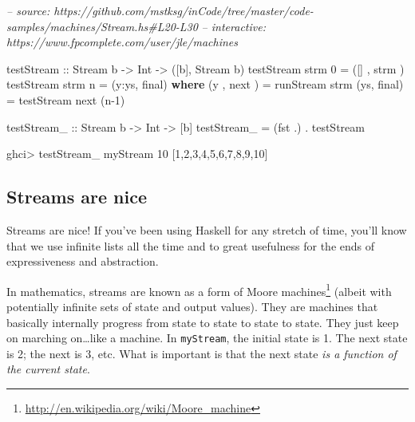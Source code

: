\documentclass[]{article}
\newenvironment{Shaded}{}{}
\newcommand{\CommentTok}[1]{\textcolor[rgb]{0.38,0.63,0.69}{\textit{#1}}}
\newcommand{\DataTypeTok}[1]{\textcolor[rgb]{0.56,0.13,0.00}{#1}}
\newcommand{\DecValTok}[1]{\textcolor[rgb]{0.25,0.63,0.44}{#1}}
\newcommand{\FunctionTok}[1]{\textcolor[rgb]{0.02,0.16,0.49}{#1}}
\newcommand{\KeywordTok}[1]{\textcolor[rgb]{0.00,0.44,0.13}{\textbf{#1}}}
\newcommand{\NormalTok}[1]{#1}
\newcommand{\OtherTok}[1]{\textcolor[rgb]{0.00,0.44,0.13}{#1}}
\renewcommand{\href}[2]{#2\footnote{\url{#1}}}
\begin{document}
\begin{Shaded}
\begin{Highlighting}[]
\CommentTok{-- source: https://github.com/mstksg/inCode/tree/master/code-samples/machines/Stream.hs#L20-L30}
\CommentTok{-- interactive: https://www.fpcomplete.com/user/jle/machines}

\OtherTok{testStream ::} \DataTypeTok{Stream}\NormalTok{ b }\OtherTok{->} \DataTypeTok{Int} \OtherTok{->}\NormalTok{ ([b], }\DataTypeTok{Stream}\NormalTok{ b)}
\NormalTok{testStream strm }\DecValTok{0} \FunctionTok{=}\NormalTok{ ([]  , strm )}
\NormalTok{testStream strm n }\FunctionTok{=}\NormalTok{ (y}\FunctionTok{:}\NormalTok{ys, final)}
  \KeywordTok{where}
\NormalTok{    (y , next )   }\FunctionTok{=}\NormalTok{ runStream  strm}
\NormalTok{    (ys, final)   }\FunctionTok{=}\NormalTok{ testStream next (n}\FunctionTok{-}\DecValTok{1}\NormalTok{)}

\OtherTok{testStream_ ::} \DataTypeTok{Stream}\NormalTok{ b }\OtherTok{->} \DataTypeTok{Int} \OtherTok{->}\NormalTok{ [b]}
\NormalTok{testStream_ }\FunctionTok{=}\NormalTok{ (fst }\FunctionTok{.}\NormalTok{) }\FunctionTok{.}\NormalTok{ testStream}
\end{Highlighting}
\end{Shaded}

\begin{Shaded}
\begin{Highlighting}[]
\NormalTok{ghci}\FunctionTok{>}\NormalTok{ testStream_ myStream }\DecValTok{10}
\NormalTok{[}\DecValTok{1}\NormalTok{,}\DecValTok{2}\NormalTok{,}\DecValTok{3}\NormalTok{,}\DecValTok{4}\NormalTok{,}\DecValTok{5}\NormalTok{,}\DecValTok{6}\NormalTok{,}\DecValTok{7}\NormalTok{,}\DecValTok{8}\NormalTok{,}\DecValTok{9}\NormalTok{,}\DecValTok{10}\NormalTok{]}
\end{Highlighting}
\end{Shaded}

\hypertarget{streams-are-nice}{%
\subsection{Streams are nice}\label{streams-are-nice}}

Streams are nice! If you've been using Haskell for any stretch of time, you'll
know that we use infinite lists all the time and to great usefulness for the
ends of expressiveness and abstraction.

In mathematics, streams are known as a form of
\href{http://en.wikipedia.org/wiki/Moore_machine}{Moore machines} (albeit with
potentially infinite sets of state and output values). They are machines that
basically internally progress from state to state to state to state. They just
keep on marching on\ldots{}like a machine. In \texttt{myStream}, the initial
state is 1. The next state is 2; the next is 3, etc. What is important is that
the next state \emph{is a function of the current state}.
\end{document}
